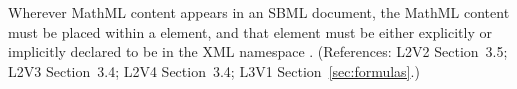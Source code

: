 Wherever MathML content appears in an SBML document, the MathML content
must be placed within a  element, and that  element
must be either explicitly or implicitly declared to be in the XML namespace
.  (References: L2V2 Section~3.5;
L2V3 Section~3.4; L2V4 Section~3.4; L3V1 Section~\ref{sec:formulas}.)
